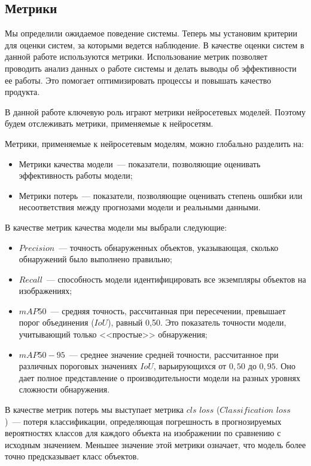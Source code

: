 \subsection{Метрики}
Мы определили ожидаемое поведение системы. Теперь мы установим критерии для оценки систем, за которыми ведется наблюдение. В качестве оценки систем в данной работе используются метрики.
Использование метрик позволяет проводить анализ данных о работе системы и делать выводы об эффективности ее работы. Это помогает оптимизировать процессы и повышать качество продукта.

В данной работе ключевую роль играют метрики нейросетевых моделей. Поэтому будем отслеживать метрики, применяемые к нейросетям.


Метрики, применяемые к нейросетевым моделям, можно глобально разделить на:
\begin{itemize}
    \item Метрики качества модели~--- показатели, позволяющие оценивать эффективность работы модели;
    \item Метрики потерь~--- показатели, позволяющие оценивать степень ошибки или несоответствия между прогнозами модели и реальными данными.
\end{itemize}

В качестве метрик качества модели мы выбрали следующие:

\begin{itemize}
    \item $Precision$~--- точность обнаруженных объектов, указывающая, сколько обнаружений было выполнено правильно;
    \item $Recall$~--- способность модели идентифицировать все экземпляры объектов на изображениях;
    \item $mAP50$~--- средняя точность, рассчитанная при пересечении, превышает порог объединения ($IoU$), равный 0,50. Это показатель точности модели, учитывающий только <<простые>> обнаружения;
    \item $mAP50-95$~--- среднее значение средней точности, рассчитанное при различных пороговых значениях $IoU$, варьирующихся от $0,50$ до $0,95$. Оно дает полное представление о производительности модели на разных уровнях сложности обнаружения.
\end{itemize}

В качестве метрик потерь мы выступает метрика $\textit{cls loss}$ ($\textit{Classification loss}$)~--- потеря классификации, определяющая погрешность в прогнозируемых вероятностях классов для каждого объекта на изображении по сравнению с исходным значением. Меньшее значение этой метрики означает, что модель более точно предсказывает класс объектов.